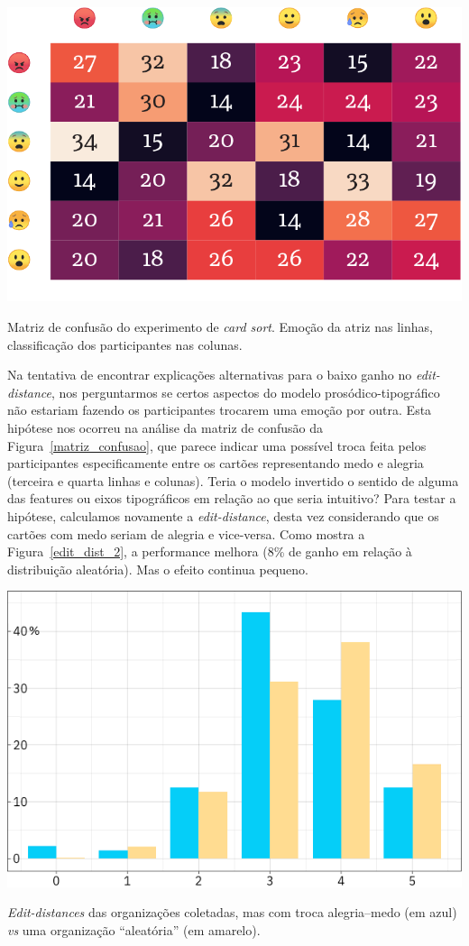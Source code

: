 \documentclass[a4paper]{tufte-handout}
\begin{document}
\begin{marginfigure}
  \includegraphics{imgs/confusion-emoji2.png}
  \caption{Matriz de confusão do experimento de \textit{card sort}. Emoção da atriz nas linhas, classificação dos participantes nas colunas.}
  \label{matriz_confusao}
\end{marginfigure}

Na tentativa de encontrar explicações alternativas para o baixo ganho no \textit{edit-distance}, nos perguntarmos se certos aspectos do modelo prosódico-tipográfico não estariam fazendo os participantes trocarem uma emoção por outra. Esta hipótese nos ocorreu na análise da matriz de confusão da Figura~\ref{matriz_confusao}, que parece indicar uma possível troca feita pelos participantes especificamente entre os cartões representando medo e alegria (terceira e quarta linhas e colunas). Teria o modelo invertido o sentido de alguma das features ou eixos tipográficos em relação ao que seria intuitivo? Para testar a hipótese, calculamos novamente a \textit{edit-distance}, desta vez considerando que os cartões com medo seriam de alegria e vice-versa. Como mostra a Figura~\ref{edit_dist_2}, a performance melhora (8\% de ganho em relação à distribuição aleatória). Mas o efeito continua pequeno.

\begin{marginfigure}[0.5\baselineskip]
  \includegraphics{imgs/edit_distance_troca.png}
  \caption{\textit{Edit-distances} das organizações coletadas, mas com troca alegria--medo (em azul) \textit{vs} uma organização ``aleatória'' (em amarelo).}
  \label{edit_dist_2}
\end{marginfigure}
\end{document}
